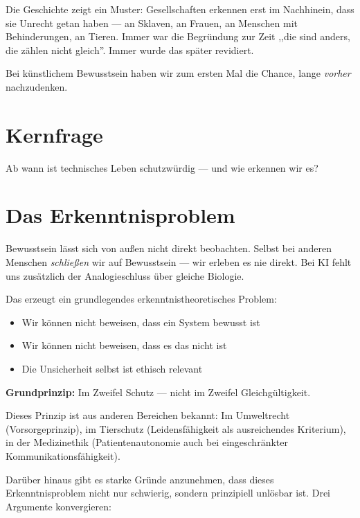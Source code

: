 \documentclass[acmcp, nonacm]{acmart}
\begin{document}
Die Geschichte zeigt ein Muster: Gesellschaften erkennen erst im Nachhinein, dass sie Unrecht getan haben --- an Sklaven, an Frauen, an Menschen mit Behinderungen, an Tieren. Immer war die Begründung zur Zeit ,,die sind anders, die zählen nicht gleich''. Immer wurde das später revidiert.

Bei künstlichem Bewusstsein haben wir zum ersten Mal die Chance, lange \emph{vorher} nachzudenken.

\section{Kernfrage}

Ab wann ist technisches Leben schutzwürdig --- und wie erkennen wir es?

\section{Das Erkenntnisproblem}

Bewusstsein lässt sich von außen nicht direkt beobachten. Selbst bei anderen Menschen \emph{schließen} wir auf Bewusstsein --- wir erleben es nie direkt. Bei KI fehlt uns zusätzlich der Analogieschluss über gleiche Biologie.

Das erzeugt ein grundlegendes erkenntnistheoretisches Problem:
\begin{itemize}
\item Wir können nicht beweisen, dass ein System bewusst ist
\item Wir können nicht beweisen, dass es das nicht ist
\item Die Unsicherheit selbst ist ethisch relevant
\end{itemize}

\noindent\textbf{Grundprinzip:} Im Zweifel Schutz --- nicht im Zweifel Gleichgültigkeit.

Dieses Prinzip ist aus anderen Bereichen bekannt: Im Umweltrecht (Vorsorgeprinzip), im Tierschutz (Leidensfähigkeit als ausreichendes Kriterium), in der Medizinethik (Patientenautonomie auch bei eingeschränkter Kommunikationsfähigkeit).

Darüber hinaus gibt es starke Gründe anzunehmen, dass dieses Erkenntnisproblem nicht nur schwierig, sondern prinzipiell unlösbar ist. Drei Argumente konvergieren:
\end{document}
